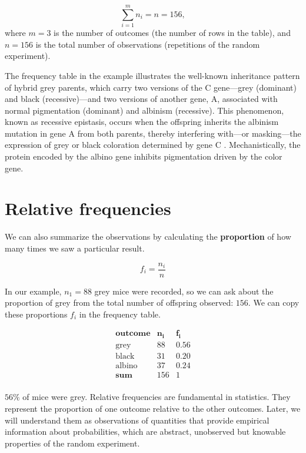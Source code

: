 \documentclass[
]{book}
\begin{document}
\[\sum_{i=1}^m n_i= n = 156,\]
where \(m=3\) is the number of outcomes (the number of rows in the table), and \(n=156\) is the total number of observations (repetitions of the random experiment).

The frequency table in the example illustrates the well-known inheritance pattern of hybrid grey parents, which carry two versions of the C gene---grey (dominant) and black (recessive)---and two versions of another gene, A, associated with normal pigmentation (dominant) and albinism (recessive). This phenomenon, known as recessive epistasis, occurs when the offspring inherits the albinism mutation in gene A from both parents, thereby interfering with---or masking---the expression of grey or black coloration determined by gene C \citep{little1914possible}. Mechanistically, the protein encoded by the albino gene inhibits pigmentation driven by the color gene.

\hypertarget{relative-frequencies}{%
\section{Relative frequencies}\label{relative-frequencies}}

We can also summarize the observations by calculating the \textbf{proportion} of how many times we saw a particular result.

\[f_i = \frac{n_i}{n}\]

In our example, \(n_1=88\) grey mice were recorded, so we can ask about the proportion of grey from the total number of offspring observed: \(156\). We can copy these proportions \(f_i\) in the frequency table.

\[
\begin{array}{ccc}
\mathbf{outcome} & \mathbf{n_i} & \mathbf{f_i} \\
\text{grey}  & 88    & 0.56  \\
\text{black}   & 31     & 0.20  \\ 
\text{albino}  & 37     & 0.24 \\ \hline
\mathbf{sum} & 156 & 1 \\
\end{array}
\]

\(56\%\) of mice were grey. Relative frequencies are fundamental in statistics. They represent the proportion of one outcome relative to the other outcomes. Later, we will understand them as observations of quantities that provide empirical information about probabilities, which are abstract, unobserved but knowable properties of the random experiment.
\end{document}
